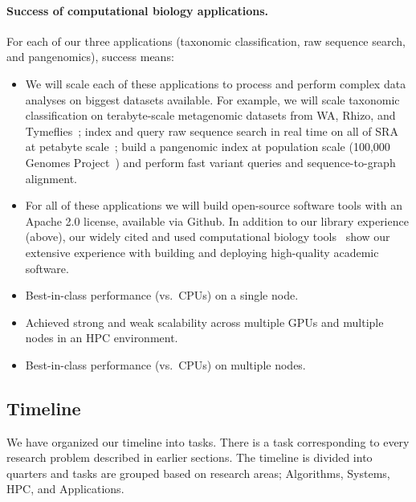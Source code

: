 \paragraph{Success of computational biology applications.}
For each of our three applications (taxonomic classification, raw sequence search, and pangenomics), success means:

\begin{itemize}[leftmargin=*,noitemsep]
  \item We will scale each of these applications to process and perform complex data analyses on biggest datasets available. For example, we will scale taxonomic classification on terabyte-scale metagenomic datasets from WA, Rhizo, and Tymeflies~\cite{hofmeyr2020terabase}; index and query raw sequence search in real time on all of SRA at petabyte scale~\cite{kodama2012sequence}; build a pangenomic index at population scale (100,000 Genomes Project~\cite{1002021100}) and perform fast variant queries and sequence-to-graph alignment.
  \item For all of these applications we will build open-source software tools with an Apache 2.0 license, available via Github. In addition to our library experience (above), our widely cited and used computational biology tools~\cite{PandeyABFJP18Cell,PandeyBJP17a,PandeyBJP17b,PandeyBJP17,pandey2020timely,pandey2021variantstore,pandey2021terrace,pandey2022iceberght} show our extensive experience with building and deploying high-quality academic software.
  \item Best-in-class performance (vs.\ CPUs) on a single node.
  \item Achieved strong and weak scalability across multiple GPUs and multiple nodes in an HPC environment.
  \item Best-in-class performance (vs.\ CPUs) on multiple nodes.
\end{itemize}


\subsection{Timeline}

We have organized our timeline into tasks. There is a task corresponding to every research problem described in earlier sections. The timeline is divided into quarters and tasks are grouped based on research areas; Algorithms, Systems, HPC, and Applications.




